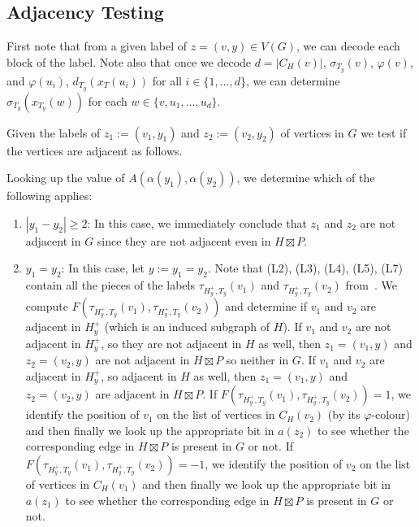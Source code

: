 \documentclass[kpfonts]{patmorin}
\let\ge\geqslant
\begin{document}
\subsection{Adjacency Testing}

First note that from a given label of $z=(v,y) \in V(G)$, we can decode each block of the label. 
Note also that once we decode $d=|C_H(v)|$, $\sigma_{T_y}(v)$, $\varphi(v)$, and $\varphi(u_i)$, $d_{T_y}(x_T(u_i))$ for all $i\in\{1,\ldots,d\}$, we can determine $\sigma_{T_y}(x_{T_y}(w))$ for each $w\in\{v,u_1,\ldots,u_d\}$.

Given the labels of $z_1:=(v_1,y_1)$ and $z_2:=(v_2,y_2)$ of vertices in $G$ we test if the vertices are adjacent as follows.

Looking up the value of $A(\alpha(y_1),\alpha(y_2))$, we determine which of the following applies:
\begin{enumerate}
  \item $|y_1-y_2|\ge 2$: 
  In this case, we immediately conclude that $z_1$ and $z_2$ are not adjacent in $G$ since they are not adjacent even in $H\boxtimes P$.
  \item $y_1=y_2$:  
  In this case, let $y:=y_1=y_2$. 
  Note that (L2), (L3), (L4), (L5), (L7) contain all the pieces of the labels $\tau_{H^+_y,T_y}(v_1)$ and $\tau_{H^+_y,T_y}(v_2)$ from~. 
  We compute $F(\tau_{H^+_y,T_y}(v_1),\tau_{H^+_y,T_y}(v_2))$ and determine if $v_1$ and $v_2$ are adjacent in $H^+_y$ (which is an induced subgraph of $H$). 
  If $v_1$ and $v_2$ are not adjacent in $H^+_y$, so they are not adjacent in $H$ as well, then $z_1=(v_1,y)$ and $z_2=(v_2,y)$ are not adjacent in $H\boxtimes P$ so neither in $G$.
  If $v_1$ and $v_2$ are adjacent in $H^+_y$, so adjacent in $H$ as well, then $z_1=(v_1,y)$ and $z_2=(v_2,y)$ are adjacent in $H\boxtimes P$. 
  If $F(\tau_{H^+_y,T_y}(v_1),\tau_{H^+_y,T_y}(v_2))=1$, 
  we identify the position of $v_1$ on the list of vertices in $C_H(v_2)$ (by its $\varphi$-colour) 
  and then finally we look up the appropriate bit in $a(z_2)$ to see whether the corresponding edge in $H\boxtimes P$ is present in $G$ or not.
  If $F(\tau_{H^+_y,T_y}(v_1),\tau_{H^+_y,T_y}(v_2))=-1$, 
  we identify the position of $v_2$ on the list of vertices in $C_H(v_1)$
  and then finally we look up the appropriate bit in $a(z_1)$ to see whether the corresponding edge in $H\boxtimes P$ is present in $G$ or not.


\end{enumerate}
\end{document}
